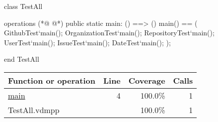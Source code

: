 \begin{vdmpp}[breaklines=true]
class TestAll

 operations
(*@
\label{main:4}
@*)
  public static main: () ==> ()
  main() ==
  (
   GithubTest`main();
   OrganizationTest`main();
   RepositoryTest`main();
   UserTest`main();
   IssueTest`main();
   DateTest`main();
  );
  
end TestAll
\end{vdmpp}
\bigskip
\begin{longtable}{|l|r|r|r|}
\hline
Function or operation & Line & Coverage & Calls \\
\hline
\hline
\hyperref[main:4]{main} & 4&100.0\% & 1 \\
\hline
\hline
TestAll.vdmpp & & 100.0\% & 1 \\
\hline
\end{longtable}

